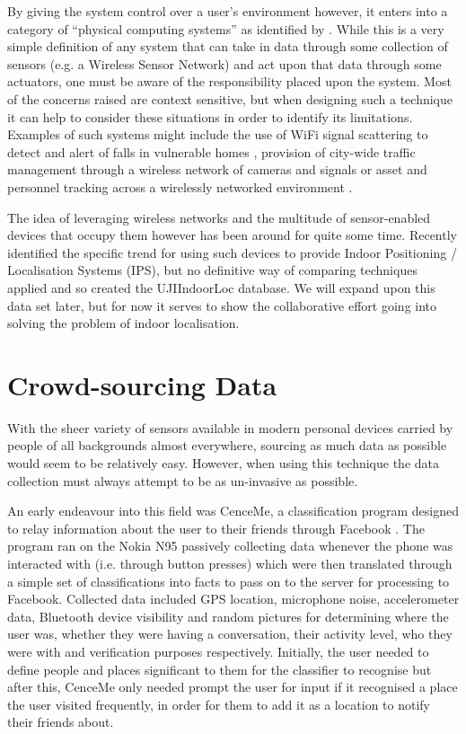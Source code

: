 \documentclass{UoYCSproject}
\begin{document}
            By giving the system control over a user's environment however, it enters into a category of ``physical computing systems'' as identified by \citet{stankovic2005opportunities}. While this is a very simple definition of any system that can take in data through some collection of sensors (e.g. a Wireless Sensor Network) and act upon that data through some actuators, one must be aware of the responsibility placed upon the system. Most of the concerns raised are context sensitive, but when designing such a technique it can help to consider these situations in order to identify its limitations. Examples of such systems might include the use of WiFi signal scattering to detect and alert of falls in vulnerable homes \citep{han2014wifall}, provision of city-wide traffic management through a wireless network of cameras and signals \citep{LATraffic} or asset and personnel tracking across a wirelessly networked environment \citep{Ekahau}.
		
            The idea of leveraging wireless networks and the multitude of sensor-enabled devices that occupy them however has been around for quite some time. Recently \citet{torres2014ujiindoorloc} identified the specific trend for using such devices to provide Indoor Positioning / Localisation Systems (IPS), but no definitive way of comparing techniques applied and so created the UJIIndoorLoc database. We will expand upon this data set later, but for now it serves to show the collaborative effort going into solving the problem of indoor localisation.
                
        \section{Crowd-sourcing Data}
        \label{sec:crowd}
        
            With the sheer variety of sensors available in modern personal devices carried by people of all backgrounds almost everywhere, sourcing as much data as possible would seem to be relatively easy. However, when using this technique the data collection must always attempt to be as un-invasive as possible. 
            
            An early endeavour into this field was CenceMe, a classification program designed to relay information about the user to their friends through Facebook \citep{miluzzo2008sensing}. The program ran on the Nokia N95 passively collecting data whenever the phone was interacted with (i.e. through button presses) which were then translated through a simple set of classifications into facts to pass on to the server for processing to Facebook. Collected data included GPS location, microphone noise, accelerometer data, Bluetooth device visibility and random pictures for determining where the user was, whether they were having a conversation, their activity level, who they were with and verification purposes respectively. Initially, the user needed to define people and places significant to them for the classifier to recognise but after this, CenceMe only needed prompt the user for input if it recognised a place the user visited frequently, in order for them to add it as a location to notify their friends about.
            
\end{document}
